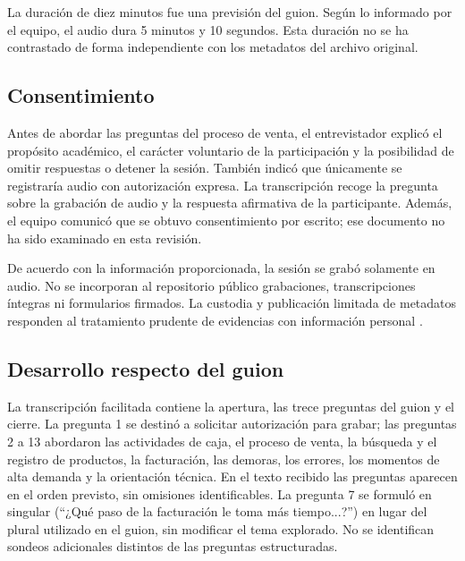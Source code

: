 La duración de diez minutos fue una previsión del guion. Según lo informado por el equipo, el audio dura 5 minutos y 10 segundos. Esta duración no se ha contrastado de forma independiente con los metadatos del archivo original.

\subsection{Consentimiento}

Antes de abordar las preguntas del proceso de venta, el entrevistador explicó el propósito académico, el carácter voluntario de la participación y la posibilidad de omitir respuestas o detener la sesión. También indicó que únicamente se registraría audio con autorización expresa. La transcripción recoge la pregunta sobre la grabación de audio y la respuesta afirmativa de la participante. Además, el equipo comunicó que se obtuvo consentimiento por escrito; ese documento no ha sido examinado en esta revisión.

De acuerdo con la información proporcionada, la sesión se grabó solamente en audio. No se incorporan al repositorio público grabaciones, transcripciones íntegras ni formularios firmados. La custodia y publicación limitada de metadatos responden al tratamiento prudente de evidencias con información personal \cite{lopdp2021}.

\subsection{Desarrollo respecto del guion}

La transcripción facilitada contiene la apertura, las trece preguntas del guion y el cierre. La pregunta 1 se destinó a solicitar autorización para grabar; las preguntas 2 a 13 abordaron las actividades de caja, el proceso de venta, la búsqueda y el registro de productos, la facturación, las demoras, los errores, los momentos de alta demanda y la orientación técnica. En el texto recibido las preguntas aparecen en el orden previsto, sin omisiones identificables. La pregunta 7 se formuló en singular (``¿Qué paso de la facturación le toma más tiempo...?'') en lugar del plural utilizado en el guion, sin modificar el tema explorado. No se identifican sondeos adicionales distintos de las preguntas estructuradas.

